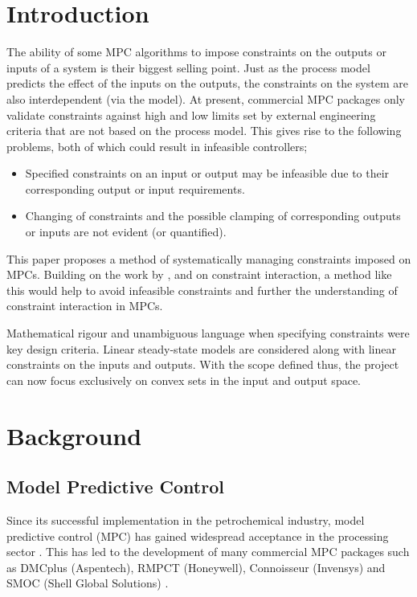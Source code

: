 \documentclass[final,authoryear,5pt,times,twocolumn]{elsarticle}
\begin{document}


\section{Introduction}\label{sec:intro}
The ability of some MPC algorithms to impose constraints on the outputs or inputs of a system is their biggest selling point.
Just as the process model predicts the effect of the inputs on the outputs, the constraints on the system are also interdependent (via the model).
At present, commercial MPC packages only validate constraints against high and low limits set by external engineering criteria that are not based on the process model.
This gives rise to the following problems, both of which could result in infeasible controllers;
\begin{itemize}
  \item Specified constraints on an input or output may be infeasible due to their corresponding output or input requirements.
  \item Changing of constraints and the possible clamping of corresponding outputs or inputs are not evident (or quantified).
\end{itemize}

This paper proposes a method of systematically managing constraints imposed on MPCs.
Building on the work by \citet{vinsonartoi}, \citet{opconproc} and \citet{limaphd} on constraint interaction, a method like this would help to avoid infeasible constraints and further the understanding of constraint interaction in MPCs.

Mathematical rigour and unambiguous language when specifying constraints were key design criteria.
Linear steady-state models are considered along with linear constraints on the inputs and outputs.
With the scope defined thus, the project can now focus exclusively on convex sets in the input and output space.


\section{Background}\label{sec:background}
\subsection{Model Predictive Control}
Since its successful implementation in the petrochemical industry, model predictive control (MPC) has gained widespread acceptance in the processing sector \citep[1]{maciejowskimpc}. 
This has led to the development of many commercial MPC packages such as DMCplus (Aspentech), RMPCT (Honeywell), Connoisseur (Invensys) and SMOC (Shell Global Solutions) \citep{qinbadgwell}.
\end{document}
